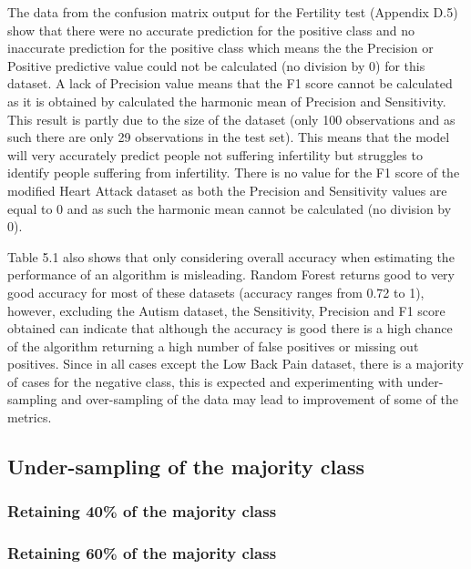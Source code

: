 The data from the confusion matrix output for the Fertility test (Appendix D.5)
show that there were no accurate prediction for the positive class and no inaccurate prediction for the positive class which means the the Precision or Positive predictive value could not be calculated (no division by 0) for this dataset. A lack of Precision value means that the F1 score cannot be calculated as it is obtained by calculated the harmonic mean of Precision and Sensitivity.\newline
This result is partly due to the size of the dataset (only 100 observations and as such there are only 29 observations in the test set). This means that the model will very accurately predict people not suffering infertility but struggles to identify people suffering from infertility.\newline
There is no value for the F1 score of the modified Heart Attack dataset as both the Precision and Sensitivity values are equal to 0 and as such the harmonic mean cannot be calculated (no division by 0).

Table 5.1 also shows that only considering overall accuracy when estimating the performance of an algorithm is misleading. Random Forest returns good to very good accuracy for most of these datasets (accuracy ranges from 0.72 to 1), however, excluding the Autism dataset, the Sensitivity, Precision and F1 score obtained can indicate that although the accuracy is good there is a high chance of the algorithm returning a high number of false positives or missing out positives. \newline
Since in all cases except the Low Back Pain dataset, there is a majority of cases for the negative class, this is expected and experimenting with under-sampling and over-sampling of the data may lead to improvement of some of the metrics.


\subsection{Under-sampling of the majority class}
\subsubsection{Retaining 40\% of the majority class}



\subsubsection{Retaining 60\% of the majority class}


